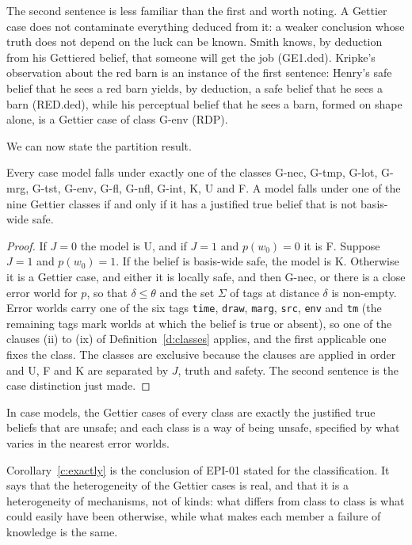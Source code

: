 \documentclass{situationist-preprint}
\begin{document}
The second sentence is less familiar than the first and worth noting. A Gettier case does not contaminate everything deduced from it: a weaker conclusion whose truth does not depend on the luck can be known. Smith knows, by deduction from his Gettiered belief, that someone will get the job (GE1.ded). Kripke's observation about the red barn is an instance of the first sentence: Henry's safe belief that he sees a red barn yields, by deduction, a safe belief that he sees a barn (RED.ded), while his perceptual belief that he sees a barn, formed on shape alone, is a Gettier case of class G-env (RDP).

We can now state the partition result.

\begin{theorem}[Partition]\label{t:partition}
Every case model falls under exactly one of the classes G-nec, G-tmp, G-lot, G-mrg, G-tst, G-env, G-fl, G-nfl, G-int, K, U and F. A model falls under one of the nine Gettier classes if and only if it has a justified true belief that is not basis-wide safe.
\end{theorem}

\begin{proof}
If $J = 0$ the model is U, and if $J = 1$ and $p(w_0) = 0$ it is F. Suppose $J = 1$ and $p(w_0) = 1$. If the belief is basis-wide safe, the model is K. Otherwise it is a Gettier case, and either it is locally safe, and then G-nec, or there is a close error world for $p$, so that $\delta \leq \theta$ and the set $\Sigma$ of tags at distance $\delta$ is non-empty. Error worlds carry one of the six tags \texttt{time}, \texttt{draw}, \texttt{marg}, \texttt{src}, \texttt{env} and \texttt{tm} (the remaining tags mark worlds at which the belief is true or absent), so one of the clauses (ii) to (ix) of Definition~\ref{d:classes} applies, and the first applicable one fixes the class. The classes are exclusive because the clauses are applied in order and U, F and K are separated by $J$, truth and safety. The second sentence is the case distinction just made.
\end{proof}

\begin{corollary}\label{c:exactly}
In case models, the Gettier cases of every class are exactly the justified true beliefs that are unsafe; and each class is a way of being unsafe, specified by what varies in the nearest error worlds.
\end{corollary}

Corollary~\ref{c:exactly} is the conclusion of EPI-01 stated for the classification. It says that the heterogeneity of the Gettier cases is real, and that it is a heterogeneity of mechanisms, not of kinds: what differs from class to class is what could easily have been otherwise, while what makes each member a failure of knowledge is the same.
\end{document}
